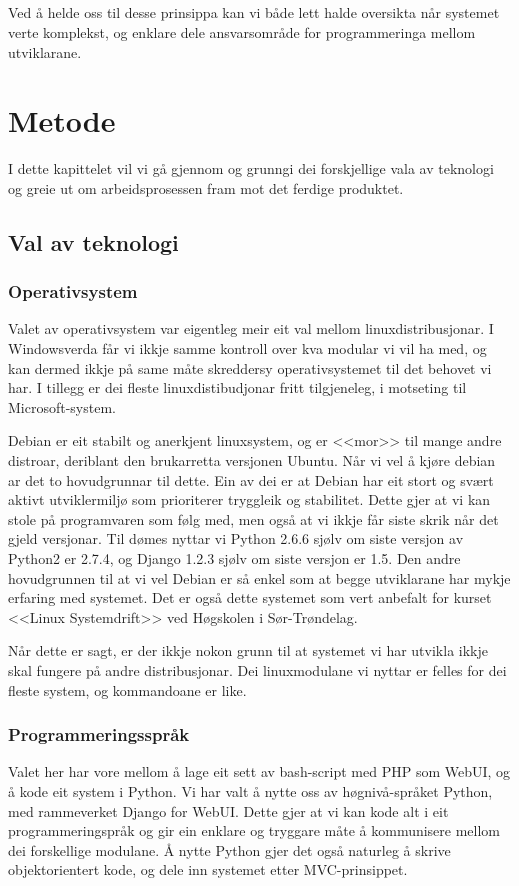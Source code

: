 \documentclass[nynorsk,12pt,a4paper,oneside]{book}
\begin{document}
\paragraph{}
Ved å helde oss til desse prinsippa kan vi både lett halde oversikta når systemet verte komplekst, og enklare dele ansvarsområde for programmeringa mellom utviklarane.

\chapter{Metode}
I dette kapittelet vil vi gå gjennom og grunngi dei forskjellige vala av teknologi og greie ut om arbeidsprosessen fram mot det ferdige produktet. 
 
\section{Val av teknologi}
\subsection{Operativsystem}
Valet av operativsystem var eigentleg meir eit val mellom linuxdistribusjonar. I Windowsverda får vi ikkje samme kontroll over kva modular vi vil ha med, og kan dermed ikkje på same måte skreddersy operativsystemet til det behovet vi har. I tillegg er dei fleste linuxdistibudjonar fritt tilgjeneleg, i motseting til Microsoft-system. 

Debian er eit stabilt og anerkjent linuxsystem, og er <<mor>> til mange andre distroar, deriblant den brukarretta versjonen Ubuntu. Når vi vel å kjøre debian ar det to hovudgrunnar til dette. Ein av dei er at Debian har eit stort og svært aktivt utviklermiljø som prioriterer tryggleik og stabilitet. Dette gjer at vi kan stole på programvaren som følg med, men også at vi ikkje får siste skrik når det gjeld versjonar. Til dømes nyttar vi Python 2.6.6 sjølv om siste versjon av Python2 er 2.7.4, og Django 1.2.3 sjølv om siste versjon er 1.5. 
Den andre hovudgrunnen til at vi vel Debian er så enkel som at begge utviklarane har mykje erfaring med systemet. Det er også dette systemet som vert anbefalt for kurset <<Linux Systemdrift>> ved Høgskolen i Sør-Trøndelag.

Når dette er sagt, er der ikkje nokon grunn til at systemet vi har utvikla ikkje skal fungere på andre distribusjonar. Dei linuxmodulane vi nyttar er felles for dei fleste system, og kommandoane er like. 

\subsection{Programmeringsspråk}
Valet her har vore mellom å lage eit sett av bash-script med PHP som WebUI, og å kode eit system i Python. Vi har valt å nytte oss av høgnivå-språket Python, med rammeverket Django for WebUI. Dette gjer at vi kan kode alt i eit programmeringspråk og gir ein enklare og tryggare måte å kommunisere mellom dei forskellige modulane. Å nytte Python gjer det også naturleg å skrive objektorientert kode, og dele inn systemet etter MVC-prinsippet. 
\end{document}
